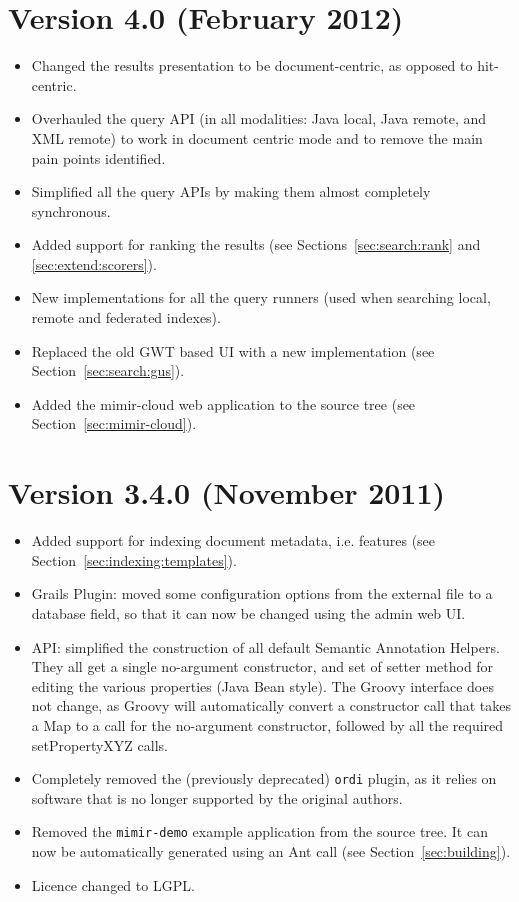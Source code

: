 \section{Version 4.0 (February 2012)}
\begin{itemize}
  \item Changed the results presentation to be document-centric, as opposed to
  hit-centric.
  \item Overhauled the query API (in all modalities: Java local, Java remote,
  and XML remote) to work in document centric mode and to remove the main pain
  points identified.
  \item Simplified all the query APIs by making them almost completely
  synchronous.
  \item Added support for ranking the results (see
  Sections~\ref{sec:search:rank}  and \ref{sec:extend:scorers}).
  \item New implementations for all the query runners (used when searching
  local, remote and federated indexes).
  \item Replaced the old GWT based UI with a new implementation (see
  Section~\ref{sec:search:gus}).
  \item Added the mimir-cloud web application to the source tree (see
  Section~\ref{sec:mimir-cloud}).
\end{itemize}

\section{Version 3.4.0 (November 2011)}

\begin{itemize}
\item Added support for indexing document metadata, i.e. features (see
Section~\ref{sec:indexing:templates}).
\item \Mimir{} Grails Plugin: moved some configuration options from the external
file to a database field, so that it can now be changed using the admin web UI.
\item API: simplified the construction of all default Semantic Annotation
Helpers. They all get a single no-argument constructor, and set of setter
method for editing the various properties (Java Bean style). The Groovy
interface does not change, as Groovy will automatically convert a constructor
call that takes a Map to a call for the no-argument constructor, followed by all
the required setPropertyXYZ calls.
\item Completely removed the (previously deprecated) {\tt ordi} plugin, as it
relies on software that is no longer supported by the original authors.
\item Removed the {\tt mimir-demo} example application from the source tree. It
can now be automatically generated using an Ant call (see 
Section~\ref{sec:building}).
\item Licence changed to LGPL.
 
\end{itemize}

